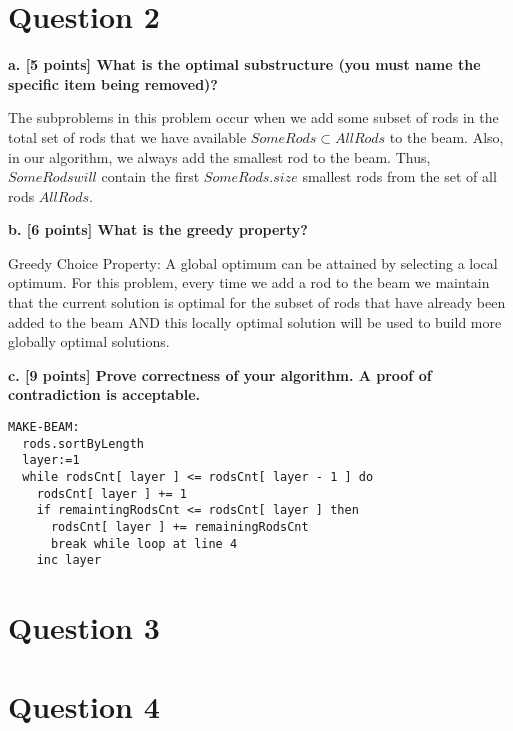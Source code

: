 \documentclass[12pt]{article}
\begin{document}
\section*{Question 2}
\textbf{a. [5 points] What is the optimal substructure (you must name the specific item being removed)?}

The subproblems in this problem occur when we add some subset of rods in the total set of rods that we have available $SomeRods \subset AllRods$ to the beam. Also, in our algorithm, we always add the smallest rod to the beam. Thus, $SomeRodswill$ contain the first $SomeRods.size$ smallest rods from the set of all rods $AllRods$. 

\noindent \textbf{b. [6 points] What is the greedy property? }

Greedy Choice Property: A global optimum can be attained by selecting a local optimum. For this problem, every time we add a rod to the beam we maintain that the current solution is optimal for the subset of rods that have already been added to the beam AND this locally optimal solution will be used to build more globally optimal solutions. 

\noindent \textbf{c. [9 points] Prove correctness of your algorithm. A proof of contradiction is acceptable.}
\begin{lstlisting}[frame=single]
MAKE-BEAM:
  rods.sortByLength
  layer:=1
  while rodsCnt[ layer ] <= rodsCnt[ layer - 1 ] do 
    rodsCnt[ layer ] += 1
    if remaintingRodsCnt <= rodsCnt[ layer ] then
      rodsCnt[ layer ] += remainingRodsCnt
      break while loop at line 4
    inc layer
\end{lstlisting}


\section*{Question 3}
\section*{Question 4}
\end{document}
